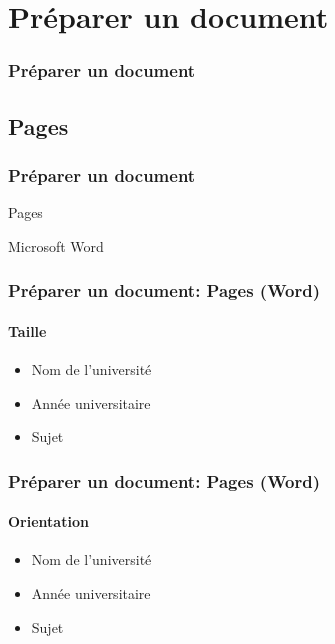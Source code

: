 \documentclass[xcolor=table]{beamer}
\begin{document}
\section{Préparer un document}

\begin{frame}
\frametitle{Préparer un document}

\end{frame}

\subsection{Pages}

\begin{frame}
\frametitle{Préparer un document}

\begin{center}
	Pages 
	
	Microsoft Word
\end{center}

\end{frame}

\begin{frame}[t]
\frametitle{Préparer un document: Pages (Word)}
\framesubtitle{Taille}

\begin{minipage}{0.38\textwidth}
	\begin{itemize}
		\item Nom de l'université 
		\item Année universitaire
		\item Sujet
	\end{itemize}
\end{minipage}
\begin{minipage}{0.6\textwidth}
\end{minipage}

\end{frame}


\begin{frame}[t]
\frametitle{Préparer un document: Pages (Word)}
\framesubtitle{Orientation}

\begin{minipage}{0.38\textwidth}
	\begin{itemize}
		\item Nom de l'université 
		\item Année universitaire
		\item Sujet
	\end{itemize}
\end{minipage}
\begin{minipage}{0.6\textwidth}
\end{minipage}

\end{frame}
\end{document}
